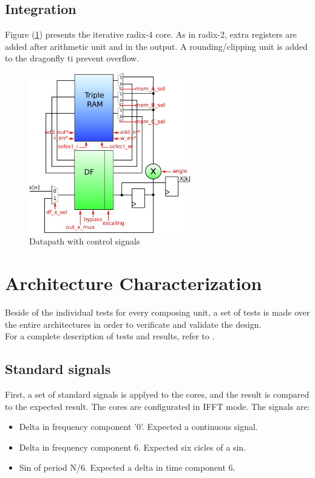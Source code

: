 \documentclass[conference]{IEEEtran}
\begin{document}
\subsection{Integration}

Figure (\ref{fig:datapathR4control}) presents the iterative radix-4 core. As in radix-2, extra registers are added after arithmetic unit and in 
the output. A rounding/clipping unit is added to the dragonfly ti prevent overflow.  

\begin{figure}[htb!]
        \centering
        \includegraphics[width=7cm]{./figures/datapathR4control.png}
        \caption{Datapath with control signals}
        \label{fig:datapathR4control}
\end{figure} 
 
\section{Architecture Characterization}

Beside of the individual tests for every composing unit, a set of tests is made over the entire architectures in order to verificate and validate the design.\\
For a complete description of tests and results, refer to \cite{tesis}.

\subsection{Standard signals}
First, a set of standard signals is applyed to the cores, and the result is compared to the expected result. The cores are 
configurated in IFFT mode.
The signals are:

\begin{itemize}
  \item Delta in frequency component '0'. Expected a continuous signal.
  \item Delta in frequency component 6. Expected six cicles of a sin.
  \item Sin of period N/6. Expected a delta in time component 6.
\end{itemize}
\end{document}
